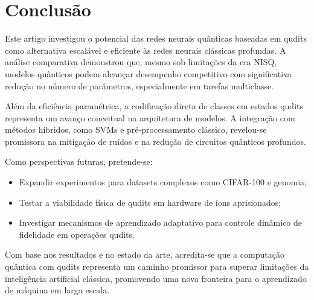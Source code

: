 \documentclass[12pt]{article}
\begin{document}
\section{Conclusão}

Este artigo investigou o potencial das redes neurais quânticas baseadas em qudits como alternativa escalável e eficiente às redes neurais clássicas profundas. A análise comparativa demonstrou que, mesmo sob limitações da era NISQ, modelos quânticos podem alcançar desempenho competitivo com significativa redução no número de parâmetros, especialmente em tarefas multiclasse.

Além da eficiência paramétrica, a codificação direta de classes em estados qudits representa um avanço conceitual na arquitetura de modelos. A integração com métodos híbridos, como SVMs e pré-processamento clássico, revelou-se promissora na mitigação de ruídos e na redução de circuitos quânticos profundos.

Como perspectivas futuras, pretende-se:
\begin{itemize}
    \item Expandir experimentos para datasets complexos como CIFAR-100 e genomia;
    \item Testar a viabilidade física de qudits em hardware de íons aprisionados;
    \item Investigar mecanismos de aprendizado adaptativo para controle dinâmico de fidelidade em operações qudits.
\end{itemize}

Com base nos resultados e no estado da arte, acredita-se que a computação quântica com qudits representa um caminho promissor para superar limitações da inteligência artificial clássica, promovendo uma nova fronteira para o aprendizado de máquina em larga escala.




\end{document}
